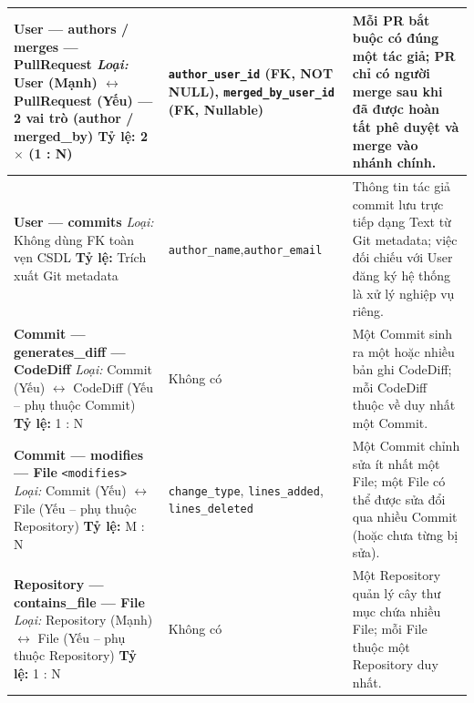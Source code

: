 \begin{longtable}{|
>{\raggedright\arraybackslash}p{}|
>{\raggedright\arraybackslash}p{}|
>{\raggedright\arraybackslash}p{}|}
\textbf{User --- authors / merges --- PullRequest}\newline
\textit{Loại:} User (Mạnh) $\leftrightarrow$ PullRequest (Yếu) --- 2 vai trò (author / merged\_by)\newline
\textbf{Tỷ lệ:} 2 $\times$ (1 : N)
& 
\texttt{author\_user\_id} (FK, NOT NULL),\newline
\texttt{merged\_by\_user\_id} (FK, Nullable)
& 
Mỗi PR bắt buộc có đúng một tác giả; PR chỉ có người merge sau khi đã được hoàn tất phê duyệt và merge vào nhánh chính.
\\ \hline

\textbf{User --- commits}\newline
\textit{Loại:} Không dùng FK toàn vẹn CSDL\newline
\textbf{Tỷ lệ:} Trích xuất Git metadata
& 
\texttt{author\_name},\newline \texttt{author\_email}
& 
Thông tin tác giả commit lưu trực tiếp dạng Text từ Git metadata; việc đối chiếu với User đăng ký hệ thống là xử lý nghiệp vụ riêng.
\\ \hline

\textbf{Commit --- generates\_diff --- CodeDiff}\newline
\textit{Loại:} Commit (Yếu) $\leftrightarrow$ CodeDiff (Yếu -- phụ thuộc Commit)\newline
\textbf{Tỷ lệ:} 1 : N
& 
Không có
& 
Một Commit sinh ra một hoặc nhiều bản ghi CodeDiff; mỗi CodeDiff thuộc về duy nhất một Commit.
\\ \hline

\textbf{Commit --- modifies --- File}\newline
\texttt{<modifies>}\newline
\textit{Loại:} Commit (Yếu) $\leftrightarrow$ File (Yếu -- phụ thuộc Repository)\newline
\textbf{Tỷ lệ:} M : N
& 
\texttt{change\_type},\newline
\texttt{lines\_added},\newline
\texttt{lines\_deleted}
& 
Một Commit chỉnh sửa ít nhất một File; một File có thể được sửa đổi qua nhiều Commit (hoặc chưa từng bị sửa).
\\ \hline

\textbf{Repository --- contains\_file --- File}\newline
\textit{Loại:} Repository (Mạnh) $\leftrightarrow$ File (Yếu -- phụ thuộc Repository)\newline
\textbf{Tỷ lệ:} 1 : N
& 
Không có
& 
Một Repository quản lý cây thư mục chứa nhiều File; mỗi File thuộc một Repository duy nhất.
\\ \hline


\end{longtable}
